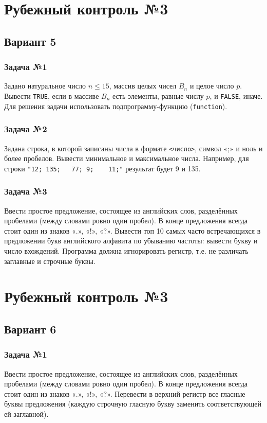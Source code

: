 \documentclass[12pt,a5paper,landscape]{report}
\begin{document}
\clearpage
\section*{Рубежный контроль №3}
\subsection*{Вариант 5}
\subsubsection*{Задача №1}
Задано натуральное число $n \le 15$, массив целых чисел $B_n$ и целое число $p$. Вывести \texttt{TRUE}, если в массиве $B_n$ есть элементы, равные числу $p$, и \texttt{FALSE}, иначе. Для решения задачи использовать подпрограмму-функцию (\texttt{function}).
\subsubsection*{Задача №2}
Задана строка, в которой записаны числа в формате \texttt{<число>}, символ «;» и ноль и более пробелов. Вывести минимальное и максимальное числа. Например, для строки \verb|"12; 135;   77; 9;    11;"| результат будет 9 и 135.
\subsubsection*{Задача №3}
Ввести простое предложение, состоящее из английских слов, разделённых пробелами (между словами ровно один пробел). В конце предложения всегда стоит один из знаков «.», «!», «?». Вывести топ 10 самых часто встречающихся в предложении букв английского алфавита по убыванию частоты: вывести букву и число вхождений. Программа должна игнорировать регистр, т.е. не различать заглавные и строчные буквы.

\section*{Рубежный контроль №3}
\subsection*{Вариант 6}
\subsubsection*{Задача №1}
Ввести простое предложение, состоящее из английских слов, разделённых пробелами (между словами ровно один пробел). В конце предложения всегда стоит один из знаков «.», «!», «?». Перевести в верхний регистр все гласные буквы предложения (каждую строчную гласную букву заменить соответствующей ей заглавной).
\end{document}
